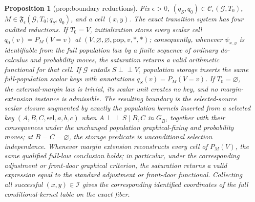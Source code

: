 \documentclass{article}
\newtheorem{proposition}{Proposition}
\begin{document}
\begin{proposition}[prop:boundary-reductions]\label{prop:boundary-reductions}
Fix \(\epsilon>0\), \((q_S,q_0)\in\mathcal C_{\epsilon}(\mathcal G,T_0)\), \(M\in\mathfrak F_{\epsilon}(\mathcal G,T_0;q_S,q_0)\), and a cell \((x,y)\). The exact transition system has four audited reductions. If \(T_0=V\), initialization stores every scalar cell \(q_0(v)=P_M(V=v)\) at \((V,\varnothing,\varnothing,\mathrm{pop},v,\ast,\ast)\); consequently, whenever \(\psi_{x,y}\) is identifiable from the full population law by a finite sequence of ordinary do-calculus and probability moves, the saturation returns a valid arithmetic functional for that cell. If \(\mathcal G\) entails \(S\perp\!\!\!\perp V\), population storage inserts the same full-population scalar keys with annotations \(q_S(v)=P_M(V=v)\). If \(T_0=\varnothing\), the external-margin law is trivial, its scalar unit creates no key, and no margin-extension instance is admissible. The resulting boundary is the selected-source scalar closure augmented by exactly the population kernels inserted from a selected key \((A,B,C,\mathrm{sel},a,b,c)\) when \(A\perp\!\!\!\perp S\mid B,C\) in \(G_{\overline B}\), together with their consequences under the unchanged population graphical-fixing and probability moves; at \(B=C=\varnothing\), the storage predicate is unconditional selection independence. Whenever margin extension reconstructs every cell of \(P_M(V)\), the same qualified full-law conclusion holds; in particular, under the corresponding adjustment or front-door graphical criterion, the saturation returns a valid expression equal to the standard adjustment or front-door functional. Collecting all successful \((x,y)\in\mathcal I\) gives the corresponding identified coordinates of the full conditional-kernel table on the exact fiber.
\end{proposition}
\end{document}
